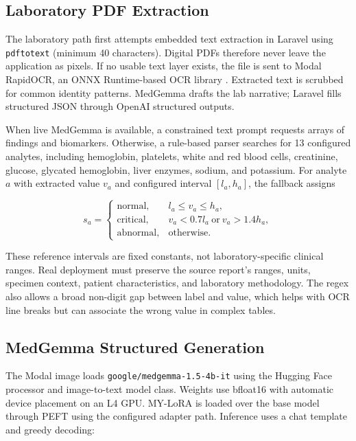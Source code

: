 \documentclass[conference]{IEEEtran}
\begin{document}
\subsection{Laboratory PDF Extraction}

The laboratory path first attempts embedded text extraction in Laravel using \texttt{pdftotext} (minimum 40 characters). Digital PDFs therefore never leave the application as pixels. If no usable text layer exists, the file is sent to Modal RapidOCR, an ONNX Runtime-based OCR library \cite{rapidocr}. Extracted text is scrubbed for common identity patterns. MedGemma drafts the lab narrative; Laravel fills structured JSON through OpenAI structured outputs.

When live MedGemma is available, a constrained text prompt requests arrays of findings and biomarkers. Otherwise, a rule-based parser searches for 13 configured analytes, including hemoglobin, platelets, white and red blood cells, creatinine, glucose, glycated hemoglobin, liver enzymes, sodium, and potassium. For analyte \(a\) with extracted value \(v_a\) and configured interval \([l_a,h_a]\), the fallback assigns

\begin{equation}
s_a=
\begin{cases}
\mathrm{normal}, & l_a\le v_a\le h_a,\\
\mathrm{critical}, & v_a<0.7l_a\ \mathrm{or}\ v_a>1.4h_a,\\
\mathrm{abnormal}, & \mathrm{otherwise}.
\end{cases}
\end{equation}

These reference intervals are fixed constants, not laboratory-specific clinical ranges. Real deployment must preserve the source report's ranges, units, specimen context, patient characteristics, and laboratory methodology. The regex also allows a broad non-digit gap between label and value, which helps with OCR line breaks but can associate the wrong value in complex tables.

\subsection{MedGemma Structured Generation}

The Modal image loads \texttt{google/medgemma-1.5-4b-it} using the Hugging Face processor and image-to-text model class. Weights use bfloat16 with automatic device placement on an L4 GPU. MY-LoRA is loaded over the base model through PEFT using the configured adapter path. Inference uses a chat template and greedy decoding:
\end{document}
